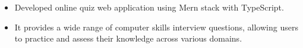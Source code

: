 \documentclass[10pt,a4paper,ragged2e,withhyper]{class}
\begin{document}
\begin{paracol}{2}
\begin{itemize}
{\begin{itemize}
                \item[\footnotesize{\ding{109}}] \hyphenation{}\normalsize{Developed online quiz web application using Mern stack with TypeScript.}
                \item[\footnotesize{\ding{109}}] \nobreak\normalsize{It provides a wide range of computer skills interview questions, allowing users to practice and assess their knowledge across various domains.}
            \end{itemize}
        }
    \end{itemize}
\end{paracol}
\end{document}
